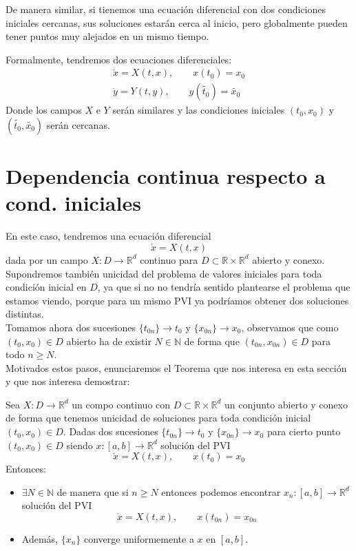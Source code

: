 De manera similar, si tienemos una ecuación diferencial con dos condiciones iniciales cercanas, sus soluciones estarán cerca al inicio, pero globalmente pueden tener puntos muy alejados en un mismo tiempo.

\noindent
Formalmente, tendremos dos ecuaciones diferenciales:
\begin{gather*}
    \dot{x} = X(t,x), \qquad x(t_0) = x_0 \\
    \dot{y} = Y(t,y), \qquad y(\tilde{t_0}) = \tilde{x_0}
\end{gather*}
Donde los campos $X$ e $Y$ serán similares y las condiciones iniciales $(t_0,x_0)$ y $(\tilde{t_0},\tilde{x_0})$ serán cercanas.

\section{Dependencia continua respecto a cond. iniciales}
\noindent
En este caso, tendremos una ecuación diferencial
\begin{equation*}
    \dot{x} = X(t,x)
\end{equation*}
dada por un campo $X:D\to \mathbb{R}^d$ continuo para $D\subset \mathbb{R}\times \mathbb{R}^d$ abierto y conexo. Supondremos también unicidad del problema de valores iniciales para toda condición inicial en $D$, ya que si no no tendría sentido plantearse el problema que estamos viendo, porque para un mismo PVI ya podríamos obtener dos soluciones distintas.\\

\noindent
Tomamos ahora dos sucesiones $\{t_{0n}\}\to t_0$ y $\{x_{0n}\}\to x_0$, observamos que como $(t_0,x_0)\in D$ abierto ha de existir $N\in \mathbb{N}$ de forma que $(t_{0n}, x_{0n})\in D$ para todo $n\geq N$.\\

\noindent
Motivados estos pasos, enunciaremos el Teorema que nos interesa en esta sección y que nos interesa demostrar:
\begin{teo}\label{teo:dep_cont}
    Sea $X:D\to \mathbb{R}^d$ un compo continuo con $D\subset \mathbb{R}\times \mathbb{R}^d$ un conjunto abierto y conexo de forma que tenemos unicidad de soluciones para toda condición inicial $(t_0,x_0)\in D$. Dadas dos sucesiones $\{t_{0n}\}\to t_0$ y $\{x_{0n}\}\to x_0$ para cierto punto $(t_0,x_0)\in D$ siendo $x:[a,b]\to \mathbb{R}^d$ solución del PVI
    \begin{equation*}
        \dot{x} = X(t,x), \qquad x(t_0) = x_0
    \end{equation*}
    Entonces:
    \begin{itemize}
        \item $\exists N\in \mathbb{N}$ de manera que si $n\geq N$ entonces podemos encontrar $x_n:[a,b]\to \mathbb{R}^d$ solución del PVI
            \begin{equation*}
                \dot{x} = X(t,x), \qquad x(t_{0n}) = x_{0n}
            \end{equation*}
        \item Además, $\{x_n\}$ converge uniformemente a $x$ en $[a,b]$.
    \end{itemize}
\end{teo}

